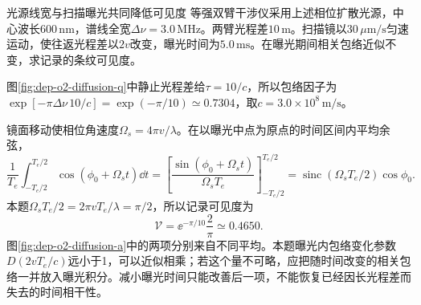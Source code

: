 \begin{example}光源线宽与扫描曝光共同降低可见度
等强双臂干涉仪采用上述相位扩散光源，中心波长$600\,\mathrm{nm}$，谱线全宽$\Delta\nu=3.0\,\mathrm{MHz}$。两臂光程差$10\,\mathrm m$。扫描镜以$30\,\mu\mathrm{m/s}$匀速运动，使往返光程差以$2v$改变，曝光时间为$5.0\,\mathrm{ms}$。在曝光期间相关包络近似不变，求记录的条纹可见度。
\end{example}
\begin{solution}
图\ref{fig:dep-o2-diffusion-q}中静止光程差给$\tau=10/c$，所以包络因子为$\exp[-\pi\Delta\nu\,10/c]=\exp(-\pi/10)\simeq0.7304$，取$c=3.0\times10^8\,\mathrm{m/s}$。

镜面移动使相位角速度$\Omega_s=4\pi v/\lambda$。在以曝光中点为原点的时间区间内平均余弦，
\[
 \frac1{T_e}\int_{-T_e/2}^{T_e/2}\cos(\phi_0+\Omega_st)\dd t
 =\left[\frac{\sin(\phi_0+\Omega_st)}{\Omega_sT_e}\right]_{-T_e/2}^{T_e/2}
 =\operatorname{sinc}(\Omega_sT_e/2)\cos\phi_0.
\]
本题$\Omega_sT_e/2=2\pi vT_e/\lambda=\pi/2$，所以记录可见度为
\[
 \mathcal V=\ee^{-\pi/10}\frac2\pi\simeq0.4650.
\]
图\ref{fig:dep-o2-diffusion-a}中的两项分别来自不同平均。本题曝光内包络变化参数$D(2vT_e/c)$远小于1，可以近似相乘；若这个量不可略，应把随时间改变的相关包络一并放入曝光积分。减小曝光时间只能改善后一项，不能恢复已经因长光程差而失去的时间相干性。
\end{solution}

